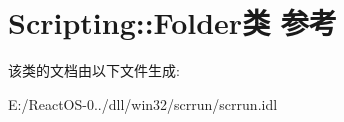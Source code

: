 \hypertarget{class_scripting_1_1_folder}{}\section{Scripting\+:\+:Folder类 参考}
\label{class_scripting_1_1_folder}


该类的文档由以下文件生成\+:\begin{DoxyCompactItemize}
\item 
E\+:/\+React\+O\+S-\/0../dll/win32/scrrun/scrrun.\+idl\end{DoxyCompactItemize}
